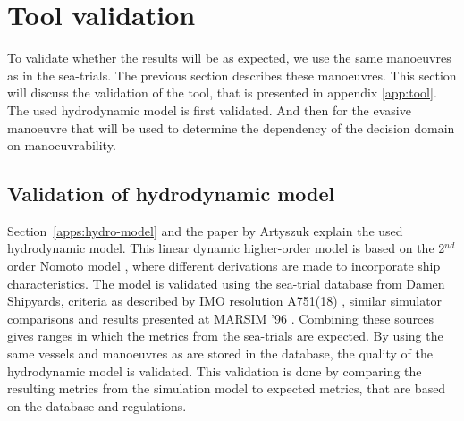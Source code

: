 \section{Tool validation}
\label{sec:manoeuvrer-results}
To validate whether the results will be as expected, we use the same manoeuvres as in the sea-trials. The previous section describes these manoeuvres. This section will discuss the validation of the tool, that is presented in appendix \ref{app:tool}. The used hydrodynamic model is first validated. And then for the evasive manoeuvre that will be used to determine the dependency of the decision domain on manoeuvrability. 

\subsection{Validation of hydrodynamic model}
Section~\ref{apps:hydro-model} and the paper by Artyszuk \cite{Artyszuk2016} explain the used hydrodynamic model. This linear dynamic higher-order model is based on the 2$^{nd}$ order Nomoto model \cite{Nomoto1957}, where different derivations are made to incorporate ship characteristics. 
The model is validated using the sea-trial database from Damen Shipyards, criteria as described by IMO resolution A751(18) \cite{Quadvlieg2003}, similar simulator comparisons \cite{Tjoswold2012} and results presented at MARSIM '96 \cite{MARSIM1996}. Combining these sources gives ranges in which the metrics from the sea-trials are expected. By using the same vessels and manoeuvres as are stored in the database, the quality of the hydrodynamic model is validated. This validation is done by comparing the resulting metrics from the simulation model to expected metrics, that are based on the database and regulations. 

